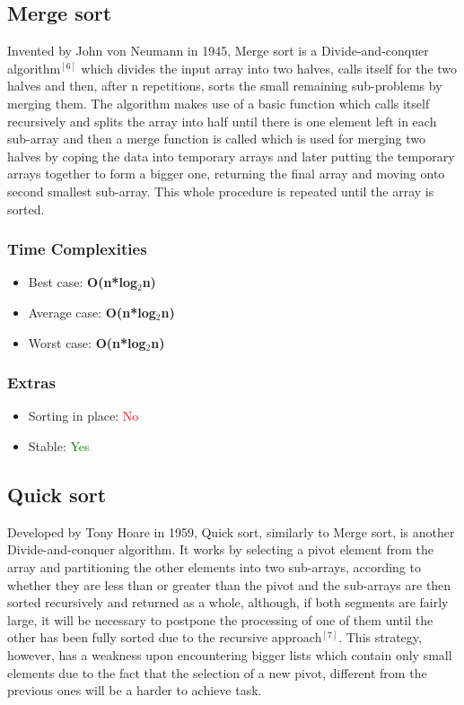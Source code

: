 \documentclass{article}
\begin{document}
\begin{multicols}{2}
\bigbreak \bigbreak \bigbreak \bigbreak \bigbreak \bigbreak \bigbreak \bigbreak


\subsection{Merge sort}
Invented by John von Neumann in 1945, Merge sort is a Divide-and-conquer algorithm$^{[6]}$ which divides the input array into two halves, calls itself for the two halves and then, after n repetitions, sorts the small remaining sub-problems by merging them. The algorithm makes use of a basic function which calls itself recursively and splits the array into half until there is one element left in each sub-array and then a merge function is called which is used for merging two halves by coping the data into temporary arrays and later putting the temporary arrays together to form a bigger one, returning the final array and moving onto second smallest sub-array. This whole procedure is repeated until the array is sorted. 

\subsubsection{Time Complexities}
\begin{itemize}
    \item Best case: \textbf{O(n*log$_2$n)}
    \item Average case: \textbf{O(n*log$_2$n)}
    \item Worst case: \textbf{O(n*log$_2$n)}
\end{itemize}

\subsubsection{Extras}
\begin{itemize}
    \item Sorting in place: \textcolor{red}{No}
    \item Stable: \textcolor{green}{Yes}
\end{itemize}
\bigbreak \bigbreak \bigbreak \bigbreak \bigbreak \bigbreak \bigbreak \bigbreak \bigbreak

\subsection{Quick sort}
Developed by Tony Hoare in 1959, Quick sort, similarly to Merge sort, is another Divide-and-conquer algorithm. It works by selecting a pivot element from the array and partitioning the other elements into two sub-arrays, according to whether they are less than or greater than the pivot and the sub-arrays are then sorted recursively and returned as a whole, although, if both segments are fairly large, it will be necessary to postpone the processing of one of them until the other has been fully sorted due to the recursive approach$^{[7]}$.  This strategy, however, has a weakness upon encountering bigger lists which contain only small elements due to the fact that the selection of a new pivot, different from the previous ones will be a harder to achieve task.

\end{multicols}
\end{document}

